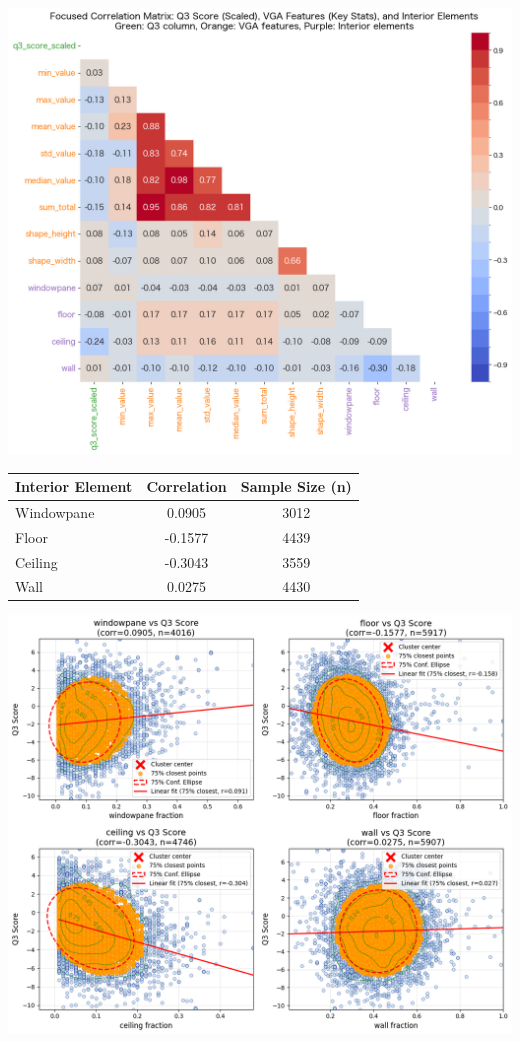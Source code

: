 \documentclass[11pt,a4paper]{article}
\begin{document}
\begin{multicols}{2}
\begin{center}
    \includegraphics[width=0.8\columnwidth]{plots/corr_vga_q3.png}
    \label{fig:corr_vga_q3}
\end{center}


\begin{center}
\begin{tabular}{lcc}
\hline
Interior Element & Correlation & Sample Size (n) \\
\hline
Windowpane & 0.0905 & 3012 \\
Floor & -0.1577 & 4439 \\
Ceiling & -0.3043 & 3559 \\
Wall & 0.0275 & 4430 \\
\hline
\end{tabular}
\label{tab:interior_corr}
\end{center}

\begin{center}
    \includegraphics[width=0.8\columnwidth]{plots/inter_q3_cluster.png}
    \label{fig:inter_q3_cluster}
\end{center}




\end{multicols}
\end{document}
